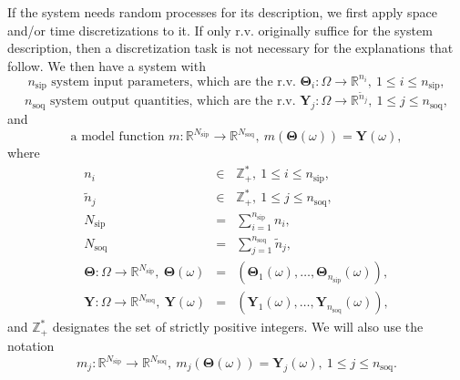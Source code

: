 If the system needs random processes for its description, we first apply space and/or time discretizations to it. 
If only r.v. originally suffice for the system description, then a discretization task is not necessary for the explanations that follow.
We then have a system with
\begin{equation}\label{eq-n-sip}
n_{\text{sip}}\text{ system input parameters, which are the r.v. }\boldsymbol{\Theta}_i:\Omega\rightarrow\mathbb{R}^{n_i},~1\leqslant i\leqslant n_{\text{sip}},
\end{equation}
\begin{equation}\label{eq-n-soq}
n_{\text{soq}}\text{ system output quantities, which are the r.v. }\mathbf{Y}_j:\Omega\rightarrow\mathbb{R}^{{\tilde{n}}_j},~1\leqslant j\leqslant n_{\text{soq}},
\end{equation}
and
\begin{equation}\label{eq-m}
\text{a model function }m:\mathbb{R}^{N_{\text{sip}}}\rightarrow\mathbb{R}^{N_{\text{soq}}},~m(\boldsymbol{\Theta}(\omega))=\mathbf{Y}(\omega),
\end{equation}
where
\begin{eqnarray}
n_i                                                                                           & \in & \mathbb{Z}_+^*,~1\leqslant i\leqslant n_{\text{sip}},                                \label{eq-n-i}        \\
{\tilde{n}}_j                                                                                 & \in & \mathbb{Z}_+^*,~1\leqslant j\leqslant n_{\text{soq}},                                \label{eq-n-j}        \\
N_{\text{sip}}                                                                                & =   & \sum_{i=1}^{n_{\text{sip}}}n_i,                                                      \label{eq-N-sip}      \\
N_{\text{soq}}                                                                                & =   & \sum_{j=1}^{n_{\text{soq}}}{\tilde{n}}_j,                                            \label{eq-N-soq}      \\
\boldsymbol{\Theta}:\Omega\rightarrow\mathbb{R}^{N_{\text{sip}}},~\boldsymbol{\Theta}(\omega) & =   & (\boldsymbol{\Theta}_1(\omega),\ldots,\boldsymbol{\Theta}_{n_{\text{sip}}}(\omega)), \label{eq-bold-theta} \\ 
         \mathbf{Y}:\Omega\rightarrow\mathbb{R}^{N_{\text{soq}}},~         \mathbf{Y}(\omega) & =   & (         \mathbf{Y}_1(\omega),\ldots,         \mathbf{Y}_{n_{\text{soq}}}(\omega)), \label{eq-bold-y}
\end{eqnarray}
and $\mathbb{Z}_+^*$ designates the set of strictly positive integers.
We will also use the notation
\begin{equation}\label{eq-m-j}
m_j:\mathbb{R}^{N_{\text{sip}}}\rightarrow\mathbb{R}^{N_{\text{soq}}},~m_j(\boldsymbol{\Theta}(\omega))=\mathbf{Y}_j(\omega),~1\leqslant j\leqslant n_{\text{soq}}.
\end{equation}

